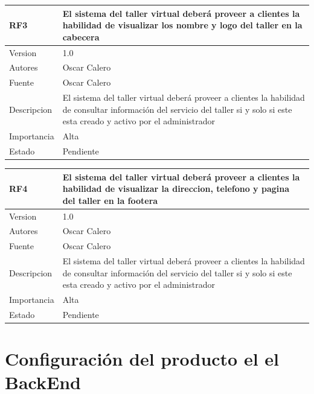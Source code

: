 \documentclass[10pt,a4paper,openany]{book}
\begin{document}
\begin{longtable}{|p{3cm}|p{3cm}|p{3cm}|p{3cm}|p{3cm}|} \hline	

RF3 & \multicolumn{4}{p{12cm}|}{El sistema del taller virtual deberá proveer a clientes la habilidad de visualizar los nombre y logo del taller en la cabecera} \\ \hline	
Version     & \multicolumn{4}{p{12cm}|}{1.0} \\ \hline	
Autores & \multicolumn{4}{p{12cm}|}{Oscar Calero} \\ \hline	
Fuente                & \multicolumn{4}{p{12cm}|}{Oscar Calero} \\ \hline	
Descripcion         & \multicolumn{4}{p{12cm}|}{El sistema del taller virtual deberá proveer a clientes la habilidad de consultar información del servicio del taller si y solo si este esta creado y activo por el administrador} \\ \hline	
Importancia                 & \multicolumn{4}{p{12cm}|}{Alta} \\ \hline	
Estado        & \multicolumn{4}{p{12cm}|}{Pendiente} \\ \hline	
\end{longtable}	


\begin{longtable}{|p{3cm}|p{3cm}|p{3cm}|p{3cm}|p{3cm}|} \hline	

RF4 & \multicolumn{4}{p{12cm}|}{El sistema del taller virtual deberá proveer a clientes la habilidad de visualizar la direccion, telefono  y pagina del taller en la footera} \\ \hline	
Version     & \multicolumn{4}{p{12cm}|}{1.0} \\ \hline	
Autores & \multicolumn{4}{p{12cm}|}{Oscar Calero} \\ \hline	
Fuente                & \multicolumn{4}{p{12cm}|}{Oscar Calero} \\ \hline	
Descripcion         & \multicolumn{4}{p{12cm}|}{El sistema del taller virtual deberá proveer a clientes la habilidad de consultar información del servicio del taller si y solo si este esta creado y activo por el administrador} \\ \hline	
Importancia                 & \multicolumn{4}{p{12cm}|}{Alta} \\ \hline	
Estado        & \multicolumn{4}{p{12cm}|}{Pendiente} \\ \hline	
\end{longtable}	


\section{Configuración del producto el el BackEnd}
\end{document}
